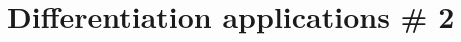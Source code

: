 \documentclass[12pt]{article}
\begin{document}
\section{Differentiation applications \# 2}
\end{document}
